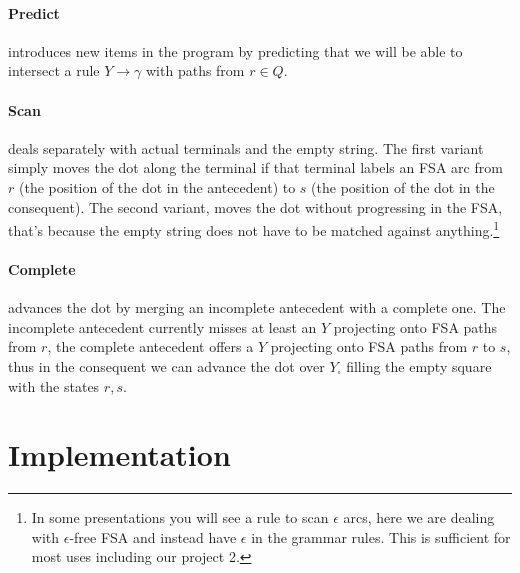 \documentclass[11pt]{article}
\begin{document}
\paragraph{Predict} introduces new items in the program by predicting that we will be able to intersect a rule $Y \rightarrow \gamma$ with paths from $r \in Q$.

\paragraph{Scan} deals separately with actual terminals and the empty string. The first variant simply moves the dot along the terminal if that terminal labels an FSA arc from $r$ (the position of the dot in the antecedent) to $s$ (the position of the dot in the consequent). The second variant, moves the dot without progressing in the FSA, that's because the empty string does not have to be matched against anything.\footnote{In some presentations you will see a rule to scan $\epsilon$ arcs, here we are dealing with $\epsilon$-free FSA and instead have $\epsilon$ in the grammar rules. This is sufficient for most uses including our project 2.}

\paragraph{Complete} advances the dot by merging an incomplete antecedent with a complete one. The incomplete antecedent currently misses at least an $Y$ projecting onto FSA paths from $r$, the complete antecedent offers a $Y$ projecting onto FSA paths from $r$ to $s$, thus in the consequent we can advance the dot over $Y_\square$ filling the empty square with the states $r,s$.



\section{Implementation} 
\end{document}
